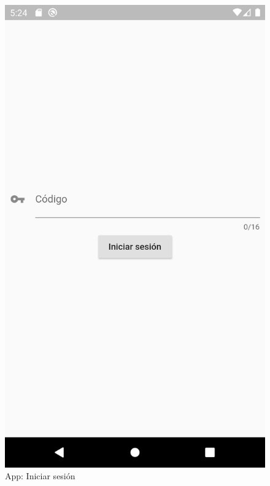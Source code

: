 \documentclass[11pt,spanish,listoffigures,listoftables,table,hyphens,dvipsnames]{tfgetsinf}
\begin{document}
\begin{figure}[ht]
   \centering
   \includegraphics[width=.9\textwidth]{app-iniciar-sesion.png}
   \caption{App: Iniciar sesión}
   \label{figura:app-iniciar-sesion}
\end{figure}
\end{document}
